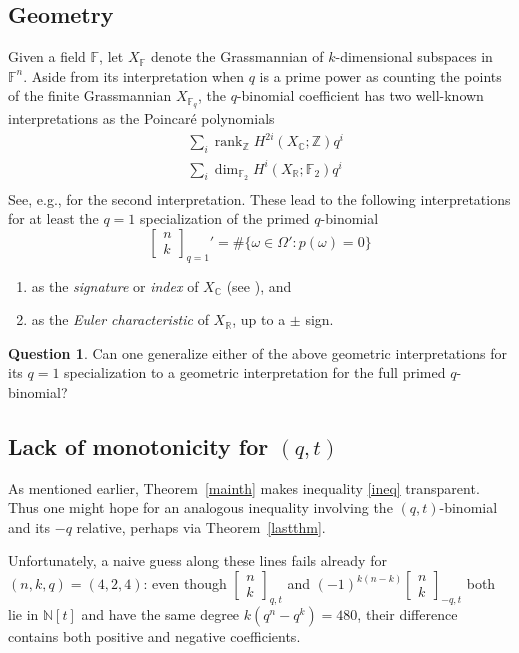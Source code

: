 \documentclass[10pt]{amsart}
\theoremstyle{plain}
\theoremstyle{definition}
\newtheorem{question}[theorem]{Question}
\theoremstyle{remark}
\numberwithin{equation}{section}
\newcommand\qbin[3]{\left[\begin{matrix} #1 \\ #2 \end{matrix} \right]_{#3}}
\newcommand\rank{\operatorname{rank}}
\newcommand\FF{\mathbb{F}}
\newcommand\ZZ{\mathbb{Z}}
\newcommand\NN{\mathbb{N}}
\newcommand\RR{\mathbb{R}}
\newcommand\CC{\mathbb{C}}
\begin{document}
\subsection{Geometry}
Given a field $\FF$, let $X_\FF$ denote the Grassmannian of
$k$-dimensional subspaces in $\FF^n$.  Aside from its interpretation
when $q$ is a prime power as counting the points of the finite
Grassmannian $X_{\FF_q}$, the $q$-binomial coefficient has 
two well-known interpretations as the Poincar\'e polynomials
$$
\begin{aligned}
&\sum_{i} \rank_\ZZ H^{2i}(X_\CC;\ZZ) q^i \\
&\sum_{i} \dim_{\FF_2} H^{i}(X_\RR;\FF_2) q^i \\
\end{aligned}
$$
See, e.g., \cite{Takeuchi} for the second interpretation.
These lead to the following interpretations
for at least the $q=1$ specialization of the
primed $q$-binomial 
$$
\qbin{n}{k}{q=1}'=
\#\{\omega\in\Omega': p(\omega)=0\}
$$

\begin{enumerate}
\item[$\bullet$]
as the {\it signature} or {\it index} of $X_\CC$ (see \cite{R-Eng}), and
\item[$\bullet$]
as the {\it Euler characteristic} of $X_\RR$, up to a $\pm$ sign.
\end{enumerate}

\begin{question}
\label{q}
Can one generalize either of
the above geometric interpretations for its $q=1$ specialization
to a geometric interpretation for the full primed $q$-binomial?
\end{question}


\subsection{Lack of monotonicity for $(q,t)$}
As mentioned earlier, Theorem~\ref{mainth} makes
inequality \eqref{ineq} transparent.  Thus one
might hope for an analogous inequality involving the
$(q,t)$-binomial and its $-q$ relative, perhaps via
Theorem~\ref{lastthm}.  

Unfortunately, a naive guess along these lines fails 
already for $(n,k,q)=(4,2,4)$:  even though
$\qbin{n}{k}{q,t}$ and $(-1)^{k(n-k)} \qbin{n}{k}{-q,t}$ both
lie in $\NN[t]$ and have the same degree $k(q^n-q^k)=480$, 
their difference 
contains both positive and negative coefficients.
\end{document}
